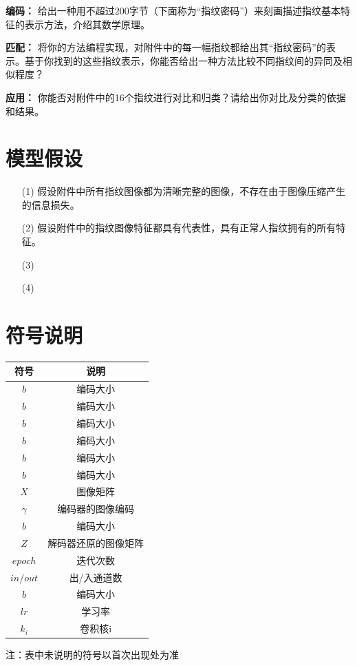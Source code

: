 \documentclass{whutmod}
\begin{document}
			\textbf{编码：} 给出一种用不超过200字节（下面称为“指纹密码”）来刻画描述指纹基本特征的表示方法，介绍其数学原理。
			
			\textbf{匹配：} 将你的方法编程实现，对附件中的每一幅指纹都给出其“指纹密码”的表示。基于你找到的这些指纹表示，你能否给出一种方法比较不同指纹间的异同及相似程度？
			
			\textbf{应用：} 你能否对附件中的16个指纹进行对比和归类？请给出你对比及分类的依据和结果。

	\section{模型假设}
		\begin{itemize}    
	\item [(1)] 假设附件中所有指纹图像都为清晰完整的图像，不存在由于图像压缩产生的信息损失。
\item [(2)] 假设附件中的指纹图像特征都具有代表性，具有正常人指纹拥有的所有特征。
		\item [(3)] 
		\item [(4)] 
		\end{itemize}

	\section{符号说明}
		\begin{table}[H]
		\centering
		\setlength{\tabcolsep}{12mm}
		\begin{tabular}{cc}
			\toprule[1.5pt]
			\multicolumn{1}{m{5cm}}{\centering 符号} & \multicolumn{1}{m{5cm}}{\centering 说明} \\
			\midrule[1pt]		
$b$  & 编码大小  \\ 
$b$  & 编码大小  \\ 
$b$  & 编码大小  \\ 
$b$  & 编码大小  \\ 
$b$  & 编码大小  \\ 
$b$  & 编码大小  \\ 
$X$  & 图像矩阵  \\ 
$\gamma$  & 编码器的图像编码  \\ 
$b$  & 编码大小  \\ 
$Z$  & 解码器还原的图像矩阵  \\ 
$epoch$  & 迭代次数  \\ 
$in/out$  & 出/入通道数  \\ 
  	$b$  & 编码大小  \\ 
$lr$  & 学习率  \\ 
$k_i$  & 卷积核i  \\ 
			\bottomrule[1.5pt]
		\end{tabular}
		\begin{tablenotes}
		\item 注：表中未说明的符号以首次出现处为准
		\end{tablenotes}
		\end{table}
	
\end{document}
